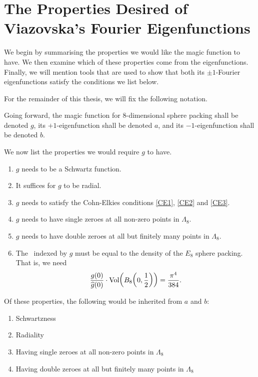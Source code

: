 \section{The Properties Desired of Viazovska's Fourier Eigenfunctions}
\label{Ch3:Sec:Properties}

We begin by summarising the properties we would like the magic function to have. We then examine which of these properties come from the eigenfunctions. Finally, we will mention tools that are used to show that both its $\pm 1$-Fourier eigenfunctions satisfy the conditions we list below.

For the remainder of this thesis, we will fix the following notation.

\begin{boxnotation}
    Going forward, the magic function for $8$-dimensional sphere packing shall be denoted $g$, its $+1$-eigenfunction shall be denoted $a$, and its $-1$-eigenfunction shall be denoted $b$.
\end{boxnotation}

We now list the properties we would require $g$ to have.

\begin{enumerate}
    \item $g$ needs to be a Schwartz function.
    \item It suffices for $g$ to be radial.
    \item $g$ needs to satisfy the Cohn-Elkies conditions \ref{CE1}, \ref{CE2} and \ref{CE3}.
    \item $g$ needs to have single zeroes at all non-zero points in $\Lambda_8$.
    \item $g$ needs to have double zeroes at all but finitely many points in $\Lambda_8$.
    \item The \CELP\ indexed by $g$ must be equal to the density of the $E_8$ sphere packing. That is, we need
    \begin{align*}
        \frac{g(0)}{\widehat{g}(0)} \cdot \operatorname{Vol}\!\left( B_8\!\left( 0, \frac{1}{2} \right) \right) = \frac{\pi^4}{384}.
    \end{align*}
\end{enumerate}

Of these properties, the following would be inherited from $a$ and $b$:

\begin{enumerate}
    \item Schwartzness
    \item Radiality
    \item Having single zeroes at all non-zero points in $\Lambda_8$
    \item Having double zeroes at all but finitely many points in $\Lambda_8$
\end{enumerate}

